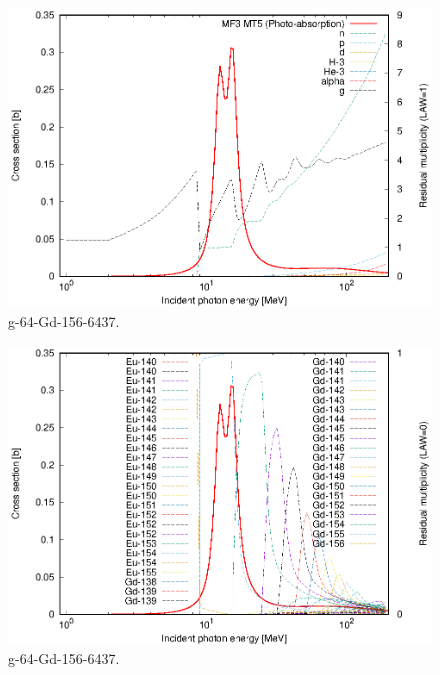 \begin{figure}
 \includegraphics[width=\linewidth]{eps/g_64-Gd-156_6437.eps}
  \caption{g-64-Gd-156-6437.}
\end{figure}
\begin{figure}
 \includegraphics[width=\linewidth]{eps-law0/g_64-Gd-156_6437.eps}
 \caption{g-64-Gd-156-6437.}
\end{figure}
\newpage \clearpage

